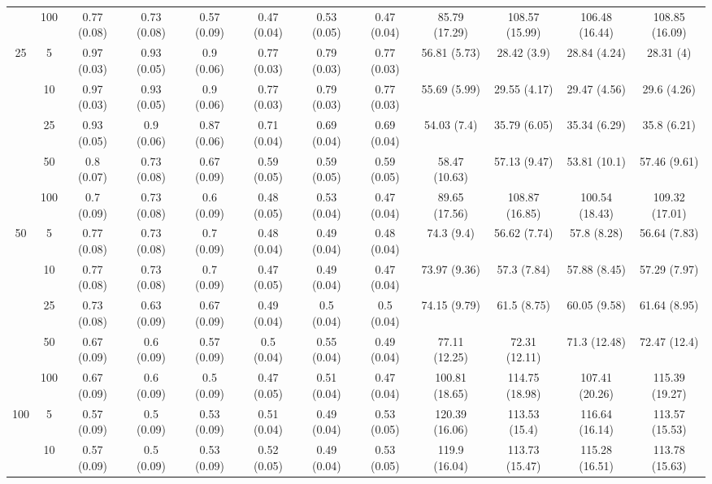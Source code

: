 \documentclass[11pt]{article}
\theoremstyle{definition}
\begin{document}
\begin{table}[H]
\begin{center}
{\begin{tabular}{cc|ccc|ccc|cccc|}
    & 100  & 0.77 (0.08) & 0.73 (0.08) & 0.57 (0.09) & 0.47 (0.04) & 0.53 (0.05) & 0.47 (0.04) & 85.79 (17.29) & 108.57 (15.99) & 106.48 (16.44) & 108.85 (16.09)\\[.3cm]  
   \multirow{5}{*}{25} & 5  & 0.97 (0.03) & 0.93 (0.05) & 0.9 (0.06) & 0.77 (0.03) & 0.79 (0.03) & 0.77 (0.03) & 56.81 (5.73) & 28.42 (3.9) & 28.84 (4.24) & 28.31 (4) \\ 
    & 10  & 0.97 (0.03) & 0.93 (0.05) & 0.9 (0.06) & 0.77 (0.03) & 0.79 (0.03) & 0.77 (0.03) & 55.69 (5.99) & 29.55 (4.17) & 29.47 (4.56) & 29.6 (4.26) \\ 
    & 25  & 0.93 (0.05) & 0.9 (0.06) & 0.87 (0.06) & 0.71 (0.04) & 0.69 (0.04) & 0.69 (0.04) & 54.03 (7.4) & 35.79 (6.05) & 35.34 (6.29) & 35.8 (6.21) \\ 
    & 50  & 0.8 (0.07) & 0.73 (0.08) & 0.67 (0.09) & 0.59 (0.05) & 0.59 (0.05) & 0.59 (0.05) & 58.47 (10.63) & 57.13 (9.47) & 53.81 (10.1) & 57.46 (9.61) \\ 
    & 100  & 0.7 (0.09) & 0.73 (0.08) & 0.6 (0.09) & 0.48 (0.05) & 0.53 (0.04) & 0.47 (0.04) & 89.65 (17.56) & 108.87 (16.85) & 100.54 (18.43) & 109.32 (17.01) \\[.3cm] 
   \multirow{5}{*}{50} & 5  & 0.77 (0.08) & 0.73 (0.08) & 0.7 (0.09) & 0.48 (0.04) & 0.49 (0.04) & 0.48 (0.04) & 74.3 (9.4) & 56.62 (7.74) & 57.8 (8.28) & 56.64 (7.83) \\ 
    & 10  & 0.77 (0.08) & 0.73 (0.08) & 0.7 (0.09) & 0.47 (0.05) & 0.49 (0.04) & 0.47 (0.04) & 73.97 (9.36) & 57.3 (7.84) & 57.88 (8.45) & 57.29 (7.97) \\ 
    & 25  & 0.73 (0.08) & 0.63 (0.09) & 0.67 (0.09) & 0.49 (0.04) & 0.5 (0.04) & 0.5 (0.04) & 74.15 (9.79) & 61.5 (8.75) & 60.05 (9.58) & 61.64 (8.95) \\ 
    & 50  & 0.67 (0.09) & 0.6 (0.09) & 0.57 (0.09) & 0.5 (0.04) & 0.55 (0.04) & 0.49 (0.04) & 77.11 (12.25) & 72.31 (12.11) & 71.3 (12.48) & 72.47 (12.4) \\ 
    & 100  & 0.67 (0.09) & 0.6 (0.09) & 0.5 (0.09) & 0.47 (0.05) & 0.51 (0.04) & 0.47 (0.04) & 100.81 (18.65) & 114.75 (18.98) & 107.41 (20.26) & 115.39 (19.27) \\[.3cm] 
  \multirow{5}{*}{100} & 5  & 0.57 (0.09) & 0.5 (0.09) & 0.53 (0.09) & 0.51 (0.04) & 0.49 (0.04) & 0.53 (0.05) & 120.39 (16.06) & 113.53 (15.4) & 116.64 (16.14) & 113.57 (15.53) \\ 
    & 10  & 0.57 (0.09) & 0.5 (0.09) & 0.53 (0.09) & 0.52 (0.05) & 0.49 (0.04) & 0.53 (0.05) & 119.9 (16.04) & 113.73 (15.47) & 115.28 (16.51) & 113.78 (15.63) \\ 

\end{tabular}}
\end{center}
\end{table}
\end{document}
